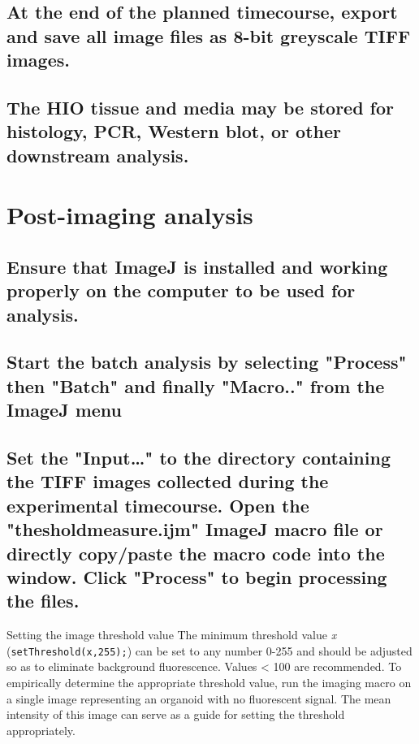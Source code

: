 \documentclass[11pt]{article}
\begin{document}
\subsection{{\sffamily } At the end of the planned timecourse, export and save all image files as 8-bit greyscale TIFF images.}
\label{sec:orgheadline66}
\subsection{{\sffamily } The HIO tissue and media may be stored for histology, PCR, Western blot, or other downstream analysis.}
\label{sec:orgheadline67}

\section{{\sffamily } Post-imaging analysis}
\label{sec:orgheadline74}
\subsection{{\sffamily } Ensure that ImageJ \supercite{Schneider:2012} is installed and working properly on the computer to be used for analysis.}
\label{sec:orgheadline69}
\subsection{{\sffamily } Start the batch analysis by selecting "Process" then "Batch" and finally "Macro.." from the ImageJ menu}
\label{sec:orgheadline70}
\subsection{{\sffamily } Set the "Input\ldots{}" to the directory containing the TIFF images collected during the experimental timecourse. Open the "thesholdmeasure.ijm" ImageJ macro file or directly copy/paste the macro code into the window. Click "Process" to begin processing the files.}
\label{sec:orgheadline71}
\begin{bclogo}[logo=\bcinfo, couleurBarre=Black, noborder=true, couleur=gray!10]{     Setting the image threshold value}
The minimum threshold value \emph{x} (\texttt{setThreshold(x,255);}) can be set to any number 0-255 and should be adjusted so as to eliminate background fluorescence. Values < 100 are recommended. To empirically determine the appropriate threshold value, run the imaging macro on a single image representing an organoid with no fluorescent signal. The mean intensity of this image can serve as a guide for setting the threshold appropriately.\\
\end{bclogo}
\end{document}
